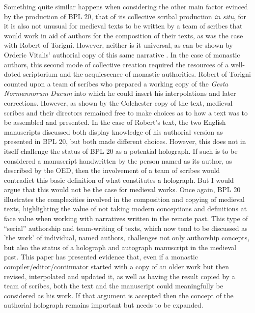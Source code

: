 \begin{paper}
Something quite similar happens when considering the other main factor
evinced by the production of BPL 20, that of its collective scribal
production \emph{in situ}, for it is also not unusual for medieval texts
to be written by a team of scribes that would work in aid of authors for
the composition of their texts, as was the case with Robert of Torigni.
However, neither is it universal, as can be shown by Orderic Vitalis'
authorial copy of this same narrative \parencite[ciii]{van_houts_gesta_1992}.
In the case of monastic authors, this second mode of collective creation
required the resources of a well-doted scriptorium and the acquiescence
of monastic authorities. Robert of Torigni counted upon a team of
scribes who prepared a working copy of the \emph{Gesta Normannorum
Ducum} into which he could insert his interpolations and later
corrections. However, as shown by the Colchester copy of the text,
medieval scribes and their directors remained free to make choices as to
how a text was to be assembled and presented. In the case of Robert's
text, the two English manuscripts discussed both display knowledge of
his authorial version as presented in BPL 20, but both made different
choices. However, this does not in itself challenge the status of BPL 20
as a potential holograph. If such is to be considered a manuscript
handwritten by the person named as its author, as described by the OED,
then the involvement of a team of scribes would contradict this basic
definition of what constitutes a holograph. But I would argue that this
would not be the case for medieval works. Once again, BPL 20 illustrates
the complexities involved in the composition and copying of medieval
texts, highlighting the value of not taking modern conceptions and
definitions at face value when working with narratives written in the
remote past. This type of ``serial'' authorship and team-writing of texts,
which now tend to be discussed as 'the work' of individual, named
authors, challenges not only authorship concepts, but also the status of
a holograph and autograph manuscript in the medieval past. This paper
has presented evidence that, even if a monastic
compiler/editor/continuator started with a copy of an older work but
then revised, interpolated and updated it, as well as having the result
copied by a team of scribes, both the text and the manuscript could
meaningfully be considered as his work. If that argument is accepted
then the concept of the authorial holograph remains important but needs
to be expanded.




\end{paper}
